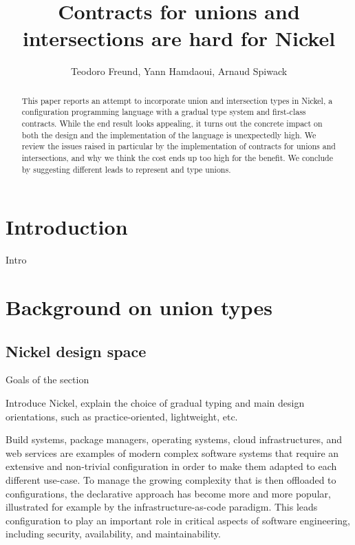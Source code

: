 \documentclass{article}
\title{Contracts for unions and intersections are hard for Nickel}
\author{Teodoro Freund, Yann Hamdaoui, Arnaud Spiwack}
\newcommand{\unsure}[2][1=]{}
\begin{document}
\maketitle

\begin{abstract}
This paper reports an attempt to incorporate union and intersection types in
Nickel, a configuration programming language with a gradual type system and
first-class contracts. While the end result looks appealing, it turns out the
concrete impact on both the design and the implementation of the language is
unexpectedly high. We review the issues raised in particular by the
implementation of contracts for unions and intersections, and why we think the
cost ends up too high for the benefit. We conclude by suggesting different leads
to represent and type unions.
\end{abstract}

\section*{Introduction}
Intro\unsure{todo}

\section{Background on union types}

\subsection{Nickel design space}

\color{red}Goals of the section

Introduce Nickel, explain the choice of gradual
typing and main design orientations, such as practice-oriented, lightweight,
etc.\vspace{0.5cm}\color{black}

Build systems, package managers, operating systems, cloud infrastructures, and
web services are examples of modern complex software systems that require an
extensive and non-trivial configuration in order to make them adapted to each
different use-case. To manage the growing complexity that is then offloaded to
configurations, the declarative approach has become more and more popular,
illustrated for example by the infrastructure-as-code paradigm. This leads
configuration to play an important role in critical aspects of software
engineering, including security, availability, and maintainability.
\end{document}
